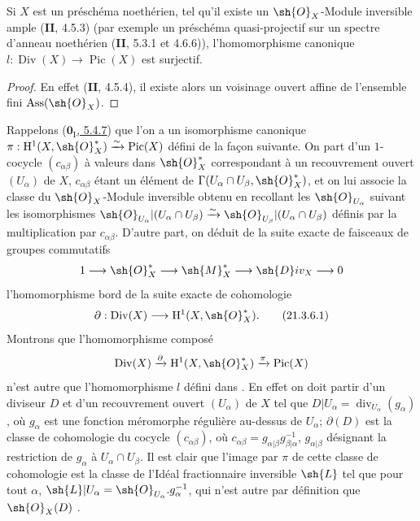 \begin{corollary}[21.3.5]
\label{IV.21.3.5}
Si $X$ est un préschéma noethérien, tel qu'il existe un $\sh{O}_X$-Module inversible ample (\textbf{II}, 4.5.3) (par exemple un préschéma quasi-projectif sur un spectre d'anneau noethérien (\textbf{II}, 5.3.1 et 4.6.6)), l'homomorphisme canonique $l:\operatorname{Div}(X)\to\operatorname{Pic}(X)$ est surjectif.
\end{corollary}

\begin{proof}
En effet (\textbf{II}, 4.5.4), il existe alors un voisinage ouvert affine de l'ensemble fini $\operatorname{Ass}(\sh{O}_X)$.
\end{proof}

\begin{remark}[21.3.6]
\label{IV.21.3.6}
Rappelons (\hyperref[0.5.4.7]{$\mathbf{0}_{\mathrm I}$, 5.4.7}) que l'on a un isomorphisme canonique $\pi:\mathrm{H}^1(X,\sh{O}_X^*)\xrightarrow{\sim}\operatorname{Pic}(X)$ défini de la façon suivante.
On part d'un $1$-cocycle $(c_{\alpha\beta})$ à valeurs dans $\sh{O}_X^*$ correspondant à un recouvrement ouvert $(U_\alpha)$ de $X$, $c_{\alpha\beta}$ étant un élément de $\Gamma(U_\alpha\cap U_\beta,\sh{O}_X^*)$, et on lui associe la classe du $\sh{O}_X$-Module inversible obtenu en recollant les $\sh{O}_{U_\alpha}$ suivant les isomorphismes $\sh{O}_{U_\alpha}|(U_\alpha\cap U_\beta)\xrightarrow{\sim}\sh{O}_{U_\beta}|(U_\alpha\cap U_\beta)$ définis par la multiplication par $c_{\alpha\beta}$.
D'autre part, on déduit de la suite exacte de faisceaux de groupes commutatifs
\[
  1\to\sh{O}_X^*\to\sh{M}_X^*\to\sh{D}iv_X\to0
\]
l'homomorphisme bord de la suite exacte de cohomologie
\[
\label{IV.21.3.6.1}
  \partial:\operatorname{Div}(X)\to\mathrm{H}^1(X,\sh{O}_X^*).
  \tag{21.3.6.1}
\]
Montrons que l'homomorphisme composé
\[
  \operatorname{Div}(X)\xrightarrow{\partial}\mathrm{H}^1(X,\sh{O}_X^*)\xrightarrow{\pi}\operatorname{Pic}(X)
\]
n'est autre que l'homomorphisme $l$ défini dans .
En effet on doit partir d'un diviseur $D$ et d'un recouvrement ouvert $(U_\alpha)$ de $X$ tel que $D|U_\alpha=\operatorname{div}_{U_\alpha}(g_\alpha)$, où $g_\alpha$ est une fonction méromorphe régulière au-dessus de $U_\alpha$;
$\partial(D)$ est la classe de cohomologie du cocycle $(c_{\alpha\beta})$, où $c_{\alpha\beta}=g_{\alpha|\beta}g_{\beta|\alpha}^{-1}$, $g_{\alpha|\beta}$ désignant la restriction de $g_\alpha$ à $U_\alpha\cap U_\beta$.
Il est clair que l'image par $\pi$ de cette classe de cohomologie est la classe de l'Idéal fractionnaire inversible $\sh{L}$ tel que pour tout $\alpha$, $\sh{L}|U_\alpha=\sh{O}_{U_\alpha}.g_\alpha^{-1}$, qui n'est autre par définition que $\sh{O}_X(D)$ .
\end{remark}

